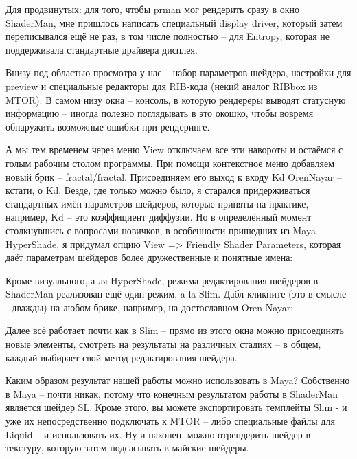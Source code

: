  Для
    продвинутых: для того, чтобы prman
    мог рендерить сразу в окно ShaderMan, мне пришлось написать
    специальный display driver, который затем переписывался ещё не раз,
    в том числе полностью – для Entropy, которая не поддерживала
    стандартные драйвера дисплея.
  

  

 Внизу под областью просмотра у нас – набор
    параметров шейдера, настройки для preview и специальные редакторы
    для RIB-кода (некий аналог RIBbox из MTOR). В самом низу окна –
    консоль, в которую рендереры выводят статусную информацию – иногда
    полезно поглядывать в это окошко, чтобы вовремя обнаружить
    возможные ошибки при рендеринге.
  

 А мы тем временем через меню View отключаем все эти
    навороты и остаёмся с голым рабочим столом программы. При помощи
    контекстное меню добавляем новый брик – fractal/fractal.
    Присоединяем его выход к входу Kd OrenNayar – кстати, о Kd. Везде,
    где только можно было, я старался придерживаться стандартных имён
    параметров шейдеров, которые приняты на практике, например, Kd –
    это коэффициент диффузии. Но в определённый момент столкнувшись с
    вопросами новичков, в особенности пришедших из Maya HyperShade, я
    придумал опцию View => Friendly Shader Parameters, которая даёт
    параметрам шейдеров более дружественные и понятные
    имена:
  

  

 Кроме визуального, а ля HyperShade, режима
    редактирования шейдеров в ShaderMan реализован ещё один
    режим, a la Slim. Дабл-кликните (это в смысле - дважды) на любом брике,
    например, на достославном Oren-Nayar:
  

  

 Далее всё работает почти как в Slim – прямо из
    этого окна можно присоединять новые элементы, смотреть на
    результаты на различных стадиях – в общем, каждый выбирает свой
    метод редактирования шейдера.
  

 Каким образом результат нашей работы можно
    использовать в Maya? Собственно в Maya – почти никак, потому что
    конечным результатом работы в ShaderMan является шейдер SL. Кроме
    этого, вы можете экспортировать темплейты Slim - и уже их
    непосредственно подключать к MTOR – либо специальные файлы для
    Liquid – и использовать их. Ну и наконец, можно отрендерить шейдер
    в текстуру, которую затем подсасывать в майские шейдеры.
  

